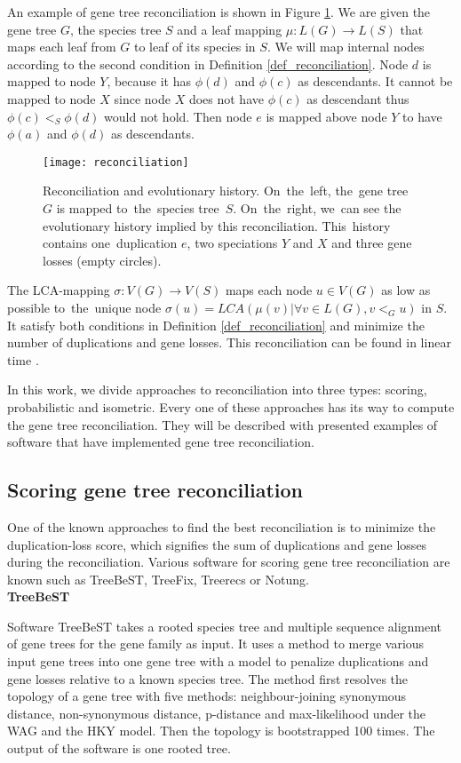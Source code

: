 An example of gene tree reconciliation is shown in Figure \ref{reconciliation}. We are given the gene tree $G$, the species tree $S$ and a leaf mapping $\mu: L(G) \rightarrow L(S)$ that maps each leaf from $G$ to leaf of its species in $S$. We will map internal nodes according to the second condition in Definition \ref{def_reconciliation}. Node $d$ is mapped to node $Y$, because it has $\phi(d)$ and $\phi(c)$ as descendants. It cannot be mapped to node $X$ since node $X$ does not have $\phi(c)$ as descendant thus $\phi(c)<_S\phi(d)$ would not hold. Then node $e$ is mapped above node $Y$ to have $\phi(a)$ and $\phi(d)$ as descendants. 

\begin{figure}[ht]
	\centering
	\label{reconciliation}
  	\texttt{[image: reconciliation]}
  	\caption{Reconciliation and evolutionary history. On~the~left, the~gene tree~$G$ is mapped to~the~species tree~$S$. On~the~right, we~can see the evolutionary history implied by this reconciliation. This~history contains one~duplication $e$, two speciations $Y$ and $X$ and three gene losses (empty circles).}
\end{figure}

The LCA-mapping $\sigma: V(G) \rightarrow V(S)$ maps each node $u \in V(G)$ as low as possible to~the~unique node $\sigma(u) = LCA(\mu(v) | \forall v \in L(G), v<_Gu)$ in $S$. It satisfy both conditions in Definition \ref{def_reconciliation} and minimize the number of duplications and gene losses. This reconciliation can be found in linear time \cite{hasic}.

In this work, we divide approaches to reconciliation into three types: scoring, probabilistic and isometric. Every one of these approaches has its way to compute the gene tree reconciliation. They will be described with presented examples of software that have implemented gene tree reconciliation. 

\subsection{Scoring gene tree reconciliation}
One of the known approaches to find the best reconciliation is to minimize the duplication-loss score, which signifies the sum of duplications and gene losses during the reconciliation. Various software for scoring gene tree reconciliation are known such as TreeBeST, TreeFix, Treerecs or Notung.\\
\textbf{TreeBeST} 

Software TreeBeST \cite{treebest_online} takes a rooted species tree and multiple sequence alignment of gene trees for the gene family as input. It uses a method to merge various input gene trees into one gene tree with a model to penalize duplications and gene losses relative to a known species tree. The method first resolves the topology of a gene tree with five methods: neighbour-joining synonymous distance, non-synonymous distance, p-distance and max-likelihood under the WAG and the HKY model. Then the topology is bootstrapped 100 times. The output of the software is one rooted tree.

